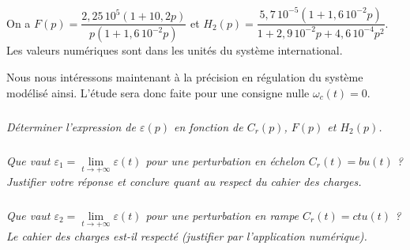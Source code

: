 \documentclass[10pt,fleqn]{article} %
\begin{document}
\begin{multicols}{2}
On a $F(p)=\dfrac{2,25\, 10^{5}\left(1+ 10,2 p\right)}{p\left(1+1,6\, 10^{-2}p\right)}$ et $H_2(p)=\dfrac{5,7\, 10^{-5}\left(1+ 1,6\, 10^{-2}p\right)}{1+2,9\, 10^{-2}p+4,6\, 10^{-4}p^2}$. Les valeurs numériques sont dans les unités du système international.


Nous nous intéressons maintenant à la précision en régulation du système modélisé ainsi. L'étude sera donc faite pour une consigne nulle $\omega_c(t) = 0$.

\subparagraph{}
\textit{Déterminer l'expression de $\varepsilon(p)$ en fonction de $C_r(p)$, $F(p)$ et $H_2(p)$.}

\subparagraph{}
\textit{Que vaut $\varepsilon_1 = \lim\limits_{t \to + \infty} \varepsilon(t)$ pour une perturbation en échelon $C_r(t)=bu(t)$ ? Justifier votre réponse et conclure quant au respect du cahier des charges.}

\subparagraph{}
\textit{Que vaut $\varepsilon_2 = \lim\limits_{t \to + \infty} \varepsilon(t)$ pour une perturbation en rampe $C_r(t)=c t u(t)$ ? Le cahier des charges est-il respecté (justifier par l'application numérique).}


\end{multicols}
\end{document}
